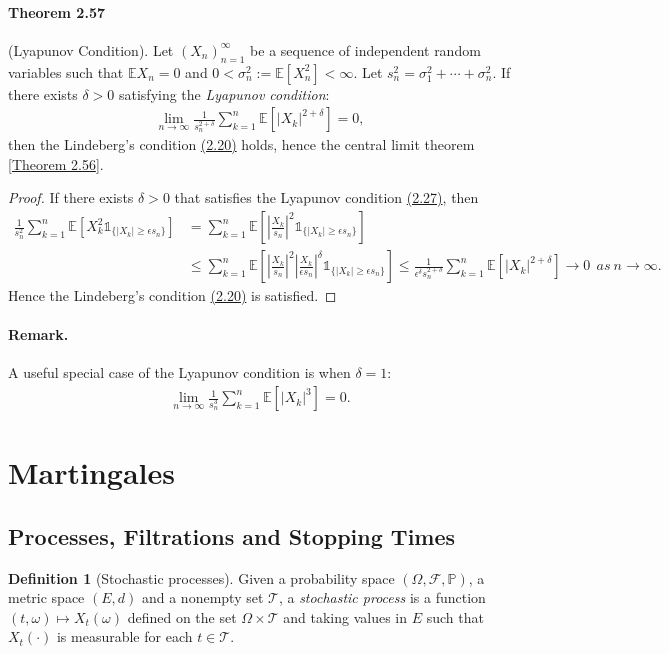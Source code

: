 \documentclass{article}
\numberwithin{equation}{section}
\newcommand{\E}{\mathbb{E}}
\renewcommand{\P}{\mathbb{P}}
\theoremstyle{plain}
\theoremstyle{definition}
\newtheorem{definition}[theorem]{Definition}
\begin{document}
\paragraph{Theorem 2.57\label{thm:2.57}} (Lyapunov Condition). Let $(X_n)_{n=1}^\infty$ be a sequence of independent random variables such that $\E X_n=0$ and $0<\sigma_n^2:=\E\left[X_n^2\right]<\infty$. Let $s_n^2=\sigma_1^2+\cdots+\sigma_n^2$. If there exists $\delta>0$ satisfying the \textit{Lyapunov condition}:
\begin{align*}
	\lim_{n\to\infty}\frac{1}{s_n^{2+\delta}}\sum_{k=1}^n\E\left[\vert X_k\vert^{2+\delta}\right]= 0,\label{eq:2.27}\tag{2.27}
\end{align*}
then the Lindeberg's condition \hyperref[eq:2.20]{(2.20)} holds, hence the central limit theorem [\hyperref[thm:2.56]{Theorem 2.56}].
\begin{proof}
If there exists $\delta>0$ that satisfies the Lyapunov condition \hyperref[eq:2.27]{(2.27)}, then
\begin{align*}
	\frac{1}{s_n^2}\sum_{k=1}^n\E\left[X_k^2\mathds{1}_{\{\vert X_k\vert\geq\epsilon s_n\}}\right] &= \sum_{k=1}^n\E\left[\left\vert\frac{X_k}{s_n}\right\vert^2\mathds{1}_{\{\vert X_k\vert\geq\epsilon s_n\}}\right]\\
	&\leq \sum_{k=1}^n\E\left[\left\vert\frac{X_k}{s_n}\right\vert^2\left\vert\frac{X_k}{\epsilon s_n}\right\vert^\delta\mathds{1}_{\{\vert X_k\vert\geq\epsilon s_n\}}\right] \leq \frac{1}{\epsilon^\delta s_n^{2+\delta}}\sum_{k=1}^n\E\left[\vert X_k\vert^{2+\delta}\right]\to 0\ \ \textit{as}\ n\to\infty.
\end{align*}
Hence the Lindeberg's condition \hyperref[eq:2.20]{(2.20)} is satisfied.
\end{proof}
\paragraph{Remark.} A useful special case of the Lyapunov condition is when $\delta=1$:
\begin{align*}
	\lim_{n\to\infty}\frac{1}{s_n^3}\sum_{k=1}^n\E\left[\vert X_k\vert^3\right]= 0.
\end{align*} 

\section{Martingales}
\subsection{Processes, Filtrations and Stopping Times}
\begin{definition}[Stochastic processes]\label{def:3.1} Given a probability space $(\Omega,\mathscr{F},\P)$, a metric space $(E,d)$ and a nonempty set $\mathcal{T}$, a \textit{stochastic process} is a function $(t,\omega)\mapsto X_t(\omega)$ defined on the set $\Omega\times\mathcal{T}$ and taking values in $E$ such that $X_t(\cdot)$ is measurable for each $t\in\mathcal{T}$. 
\end{definition}
\end{document}
